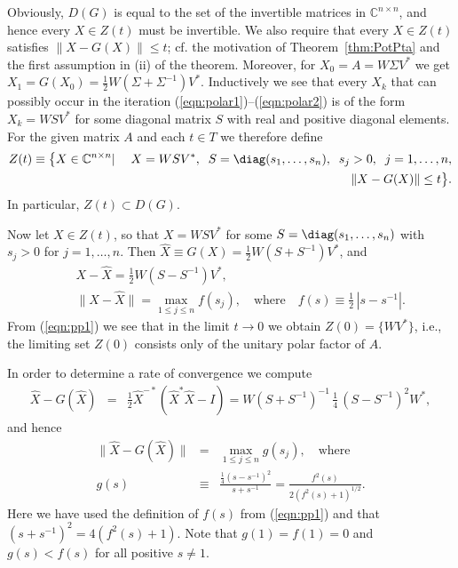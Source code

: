 \documentclass{siamltex}
\begin{document}
Obviously, $D(G)$ is equal to the set of the invertible matrices in
${\mathbb C}^{n\times n}$, and hence every $X\in Z(t)$ must be invertible.
We also require that every $X\in Z(t)$ satisfies $\|X-G(X)\|\leq t$; cf.
the motivation of Theorem~\ref{thm:PotPta} and the first assumption in (ii)
of the theorem. Moreover, for $X_0=A=W\Sigma V^*$ we get
$X_1=G(X_0)=\frac12 W(\Sigma+\Sigma^{-1})V^*$.
Inductively we see that every $X_k$ that can possibly occur in the iteration
(\ref{eqn:polar1})--(\ref{eqn:polar2}) is of the form $X_k=WSV^*$ for some diagonal
matrix $S$ with real and positive diagonal elements. For the given matrix $A$ and
each $t\in T$ we therefore define
\begin{eqnarray*}
Z(t) \equiv \bigl\{  X\in {\mathbb C}^{n\times n} & | &\; X=WSV^*,\;\;S={\diag}(s_1,\dots,s_n),\;\;
s_j>0,\;\; j=1,\dots,n, \\
& & \;\|X-G(X)\|\leq t \bigr\}.
\end{eqnarray*}
In particular, $Z(t)\subset D(G)$.

Now let $X\in Z(t)$, so that $X=WSV^*$ for some $S={\diag}(s_1,\dots,s_n)$ with $s_j>0$ for $j=1,\dots,n$.
Then $\widehat{X}\equiv G(X)=\frac12 W(S+S^{-1})V^*$, and
\begin{eqnarray}
& & X-\widehat{X} = \frac12 W(S-S^{-1})V^*,\nonumber\\
& & \|X-\widehat{X}\| = \max_{1\leq j\leq n} f(s_j),\quad\mbox{where}\quad
f(s)\equiv \frac12\,|s-s^{-1}|.\label{eqn:pp1}
\end{eqnarray}
From (\ref{eqn:pp1}) we see that in the limit $t\rightarrow 0$ we
obtain $Z(0)=\{WV^*\}$, i.e., the limiting set $Z(0)$ consists only of the unitary polar factor of $A$.

In order to determine a rate of convergence we compute
\begin{eqnarray}
\widehat{X}-G(\widehat{X}) &=& \frac12 \widehat{X}^{-*}(\widehat{X}^*\widehat{X}-I)
= W (S+S^{-1})^{-1}\,\frac14\,(S-S^{-1})^2W^*,\label{eqn:eq}
\end{eqnarray}
and hence
\begin{eqnarray}
\|\widehat{X}-G(\widehat{X})\| &=& \max_{1\leq j\leq n}g(s_j),\quad\mbox{where}\label{eqn:pp2}\\
g(s) &\equiv& \frac{\frac14 (s-s^{-1})^2}{s+s^{-1}}=\frac{f^2(s)}{2(f^2(s)+1)^{1/2}}.\label{eqn:pp3}
\end{eqnarray}
Here we have used the definition of $f(s)$ from (\ref{eqn:pp1}) and that
$(s+s^{-1})^2=4(f^2(s)+1)$. Note that $g(1)=f(1)=0$ and $g(s)<f(s)$ for
all positive $s\neq 1$.
\end{document}
